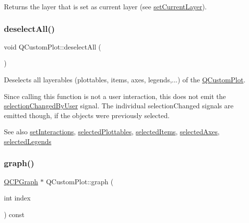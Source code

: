 Returns the layer that is set as current layer (see \hyperlink{classQCustomPlot_a73a6dc47c653bb6f8f030abca5a11852}{set\+Current\+Layer}). \mbox{\label{classQCustomPlot_a9d4808ab925b003054085246c92a257c}} 
\subsubsection{\texorpdfstring{deselect\+All()}{deselectAll()}}
{\footnotesize\ttfamily void Q\+Custom\+Plot\+::deselect\+All (\begin{DoxyParamCaption}{ }\end{DoxyParamCaption})}

Deselects all layerables (plottables, items, axes, legends,...) of the \hyperlink{classQCustomPlot}{Q\+Custom\+Plot}.

Since calling this function is not a user interaction, this does not emit the \hyperlink{classQCustomPlot_a500c64a109bc773c973ad274f2fa4190}{selection\+Changed\+By\+User} signal. The individual selection\+Changed signals are emitted though, if the objects were previously selected.

\begin{DoxySeeAlso}{See also}
\hyperlink{classQCustomPlot_a5ee1e2f6ae27419deca53e75907c27e5}{set\+Interactions}, \hyperlink{classQCustomPlot_a747faaab57c56891e901a1e97fa4359a}{selected\+Plottables}, \hyperlink{classQCustomPlot_afda487bcf2d6cf1a57173d82495e29ba}{selected\+Items}, \hyperlink{classQCustomPlot_a7e6b07792b1cb2c31681596582d14dbe}{selected\+Axes}, \hyperlink{classQCustomPlot_ac87624ddff1cbf4064781a8e8ae321c4}{selected\+Legends} 
\end{DoxySeeAlso}
\mbox{\label{classQCustomPlot_a6ecae130f684b25276fb47bd3a5875c6}} 
\subsubsection{\texorpdfstring{graph()}{graph()}\hspace{0.1cm}{\footnotesize\ttfamily [1/2]}}
{\footnotesize\ttfamily \hyperlink{classQCPGraph}{Q\+C\+P\+Graph} $\ast$ Q\+Custom\+Plot\+::graph (\begin{DoxyParamCaption}\item[{int}]{index }\end{DoxyParamCaption}) const}

